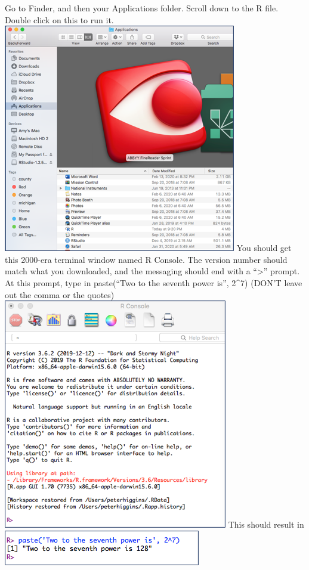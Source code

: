 \documentclass[
]{book}
\begin{document}
Go to Finder, and then your Applications folder. Scroll down to the R file. Double click on this to run it.
\includegraphics{images/findrmac.png}
You should get this 2000-era terminal window named R Console. The version number should match what you downloaded, and the messaging should end with a ``\textgreater{}'' prompt.
At this prompt, type in
paste(``Two to the seventh power is'', 2\^{}7)
(DON'T leave out the comma or the quotes)
\includegraphics{images/rconsolemac.png}
This should result in
\includegraphics{images/mactestR.png}
\end{document}
